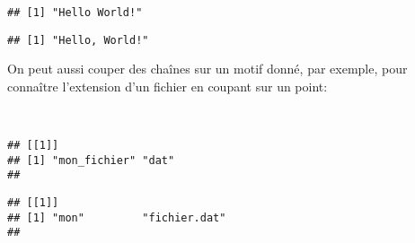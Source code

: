 \begin{knitrout}
\color{fgcolor}\begin{kframe}
\begin{flushleft}
\ttfamily\noindent
{}\hlkeyword{(}\hlkeyword{,}{\ }\hlkeyword{)}\mbox{}
\normalfont
\end{flushleft}
\begin{verbatim}
## [1] "Hello World!"
\end{verbatim}
\begin{flushleft}
\ttfamily\noindent
{}\hlkeyword{(}\hlkeyword{,}{\ }\hlkeyword{,}{\ }\hlargument{=}{\ }\hlkeyword{)}\mbox{}
\normalfont
\end{flushleft}
\begin{verbatim}
## [1] "Hello, World!"
\end{verbatim}
\end{kframe}
\end{knitrout}


\noindent On peut aussi couper des chaînes sur un motif donné, par exemple, pour connaître l'extension d'un fichier en coupant sur un point:

\begin{knitrout}
\color{fgcolor}\begin{kframe}
\begin{flushleft}
\ttfamily\noindent
{}\hlassignement{\usebox{\hlnormalsizeboxlessthan}-}{\ }\hspace*{\fill}\\
\hlstd{}\hlkeyword{(}\hlkeyword{,}{\ }\hlkeyword{)}\mbox{}
\normalfont
\end{flushleft}
\begin{verbatim}
## [[1]]
## [1] "mon_fichier" "dat"        
## 
\end{verbatim}
\begin{flushleft}
\ttfamily\noindent
{}\hlkeyword{(}\hlkeyword{,}{\ }\hlkeyword{)}\mbox{}
\normalfont
\end{flushleft}
\begin{verbatim}
## [[1]]
## [1] "mon"         "fichier.dat"
## 
\end{verbatim}
\end{kframe}
\end{knitrout}


